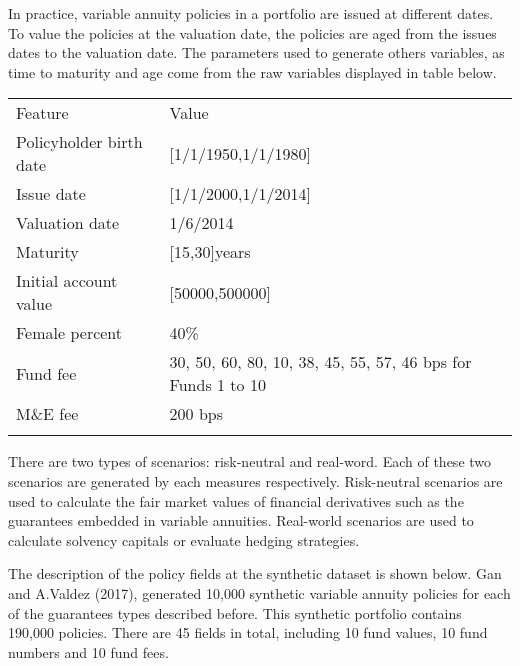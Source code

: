 In practice, variable annuity policies in a portfolio are issued at different dates. To value the policies at the valuation date, the policies are aged from the issues dates to the valuation date. The parameters used to generate others variables, as time to maturity and age come from the raw variables displayed in table below.

\renewcommand{\arraystretch}{1.5}
\begin{center}
\begin{tabular}{l l l}
		\topline
		\headcol Feature & Value \\
		\midline
		Policyholder birth date & [1/1/1950,1/1/1980] \\
		Issue date & [1/1/2000,1/1/2014] \\
		Valuation date & 1/6/2014 \\
		Maturity & [15,30]years \\
		Initial account value & [50000,500000] \\
		Female percent & 40\% \\
		Fund fee & 30, 50, 60, 80, 10, 38, 45, 55, 57, 46 bps for Funds 1 to 10 \\
		M\&E fee & 200 bps \\
		\bottomlinec
\end{tabular}
\end{center}

There are two types of scenarios: risk-neutral and real-word. Each of these two scenarios are generated by each measures respectively. Risk-neutral scenarios are used to calculate the fair market values of financial derivatives such as the guarantees embedded in variable annuities. Real-world scenarios are used to calculate solvency capitals or evaluate hedging strategies.

The description of the policy fields at the synthetic dataset is shown below. Gan and A.Valdez (2017), generated 10,000 synthetic variable annuity policies for each of the guarantees types described before. This synthetic portfolio contains 190,000 policies. There are 45 fields in total, including 10 fund values, 10 fund numbers and 10 fund fees.

